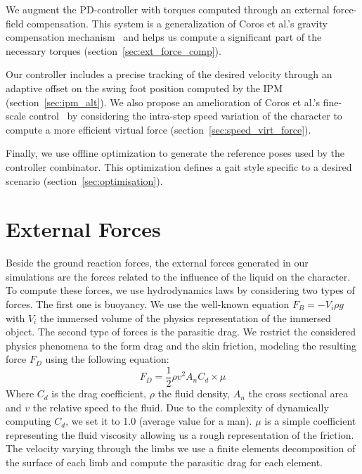 \documentclass[conference]{acmsiggraph}
\begin{document}
We augment the PD-controller with torques computed through an external force-field compensation. This system is a generalization of Coros et al.'s gravity compensation mechanism~\cite{coros2010generalized} and helps us compute a significant part of the necessary torques (section~\ref{sec:ext_force_comp}).

Our controller includes a precise tracking of the desired velocity through an adaptive offset on the swing foot position computed by the IPM (section~\ref{sec:ipm_alt}). We also propose an amelioration of Coros et al.'s fine-scale control~\cite{coros2010generalized} by considering the intra-step speed variation of the character to compute a more efficient virtual force (section~\ref{sec:speed_virt_force}).

Finally, we use offline optimization to generate the reference poses used by the controller combinator. This optimization defines a gait style specific to a desired scenario (section~\ref{sec:optimisation}).

\section{External Forces}
\label{sec:ext_forces}

Beside the ground reaction forces, the external forces generated in our simulations are the forces related to the influence of the liquid on the character. To compute these forces, we use hydrodynamics laws by considering two types of forces. The first one is buoyancy. We use the well-known equation $F_{B}=-V_i \rho g$ with $V_i$ the immersed volume of the physics representation of the immersed object. The second type of forces is the parasitic drag. We restrict the considered physics phenomena to the form drag and the skin friction, modeling the resulting force $F_D$ using the following equation:
$$
F_D=\frac{1}{2} \rho v^2 A_n C_d \times \mu
$$
Where $C_d$ is the drag coefficient, $\rho$ the fluid density, $A_n$ the cross sectional area and $v$ the relative speed to the fluid. Due to the complexity of dynamically computing $C_d$, we set it to 1.0 (average value for a man). $\mu$ is a simple coefficient representing the fluid viscosity allowing us a rough representation of the friction. The velocity varying through the limbs we use a finite elements decomposition of the surface of each limb and compute the parasitic drag for each element.
\end{document}
